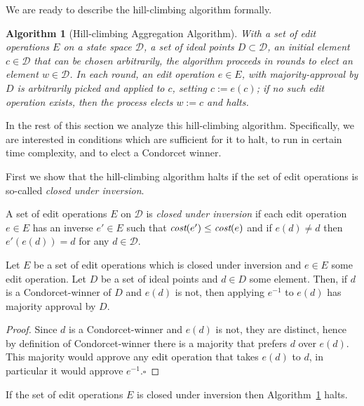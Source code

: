 \documentclass[sigconf]{aamas}  %
\newtheorem{algorithm}{Algorithm}
\newcommand{\qqed}{\hfill$\square$}
\newcommand{\calD}{\mathcal{D}}
\newcommand{\cost}{\emph{cost}}
\begin{document}
We are ready to describe the hill-climbing algorithm formally.

\begin{algorithm}[Hill-climbing Aggregation Algorithm]\label{algorithm:iva}
With a set of edit operations $E$ on a state space $\calD$, a set of ideal points $D \subset \calD$, an initial element $c \in \calD$ that can be chosen arbitrarily, the algorithm proceeds in rounds to elect an element $w \in \calD$.   In each round, an edit operation $e \in E$, with majority-approval by $D$ is arbitrarily picked and applied to $c$, setting $c := e(c)$;
if no such edit operation exists, then the process elects $w:=c$ and halts.
\end{algorithm}

In the rest of this section we analyze this hill-climbing algorithm. Specifically, we are interested in conditions which are sufficient for it to halt, to run in certain time complexity, and to elect a Condorcet winner.

First we show that the hill-climbing algorithm halts if the set of edit operations is so-called \emph{closed under inversion}.

\begin{definition}
%
A set of edit operations $E$ on $\calD$ is \emph{closed under inversion} if each edit operation $e \in E$ has an inverse $e' \in E$ such that $\cost(e') \leq \cost(e)$ and if $e(d) \ne d$ then $e'(e(d)) = d$ for any $d \in \calD$.
%
\end{definition}

\begin{lemma}\label{lemma:inverse}
Let $E$ be a set of edit operations which is closed under inversion and $e \in E$ some edit operation.
Let $D$ be a set of ideal points and $d \in D$ some element.
Then, if $d$ is a Condorcet-winner of $D$ and $e(d)$ is not,
then applying $e^{-1}$ to $e(d)$ has majority approval by $D$.
\end{lemma}

\begin{proof}
%
Since $d$ is a Condorcet-winner and $e(d)$ is not, they are distinct, hence by definition of Condorcet-winner there is a majority that prefers $d$ over $e(d)$.  This majority would approve any edit operation that takes $e(d)$ to $d$, in particular it would approve $e^{-1}$.\qqed
%
\end{proof}

\begin{lemma}\label{lemma:stops}
If the set of edit operations $E$ is closed under inversion then Algorithm~\ref{algorithm:iva} halts.
\end{lemma}
\end{document}
